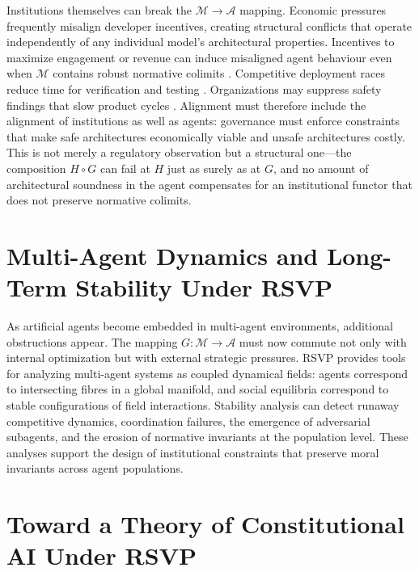 \documentclass[12pt]{article}
\theoremstyle{definition}
\begin{document}
Institutions themselves can break the $\mathcal{M} \to \mathcal{A}$ mapping.
Economic pressures frequently misalign developer incentives, creating structural
conflicts that operate independently of any individual model's architectural
properties. Incentives to maximize engagement or revenue can induce misaligned
agent behaviour even when $\mathcal{M}$ contains robust normative colimits
\citep{zeng2023does}. Competitive deployment races reduce time for verification
and testing \citep{cotra2022without}. Organizations may suppress safety findings
that slow product cycles \citep{leike2022alignment}. Alignment must therefore
include the alignment of institutions as well as agents: governance must enforce
constraints that make safe architectures economically viable and unsafe
architectures costly. This is not merely a regulatory observation but a
structural one---the composition $H \circ G$ can fail at $H$ just as surely as
at $G$, and no amount of architectural soundness in the agent compensates for an
institutional functor that does not preserve normative colimits.

\section{Multi-Agent Dynamics and Long-Term Stability Under RSVP}

As artificial agents become embedded in multi-agent environments, additional
obstructions appear. The mapping $G : \mathcal{M} \to \mathcal{A}$ must now
commute not only with internal optimization but with external strategic
pressures. RSVP provides tools for analyzing multi-agent systems as coupled
dynamical fields: agents correspond to intersecting fibres in a global manifold,
and social equilibria correspond to stable configurations of field interactions.
Stability analysis can detect runaway competitive dynamics, coordination
failures, the emergence of adversarial subagents, and the erosion of normative
invariants at the population level. These analyses support the design of
institutional constraints that preserve moral invariants across agent
populations.

\section{Toward a Theory of Constitutional AI Under RSVP}
\end{document}
